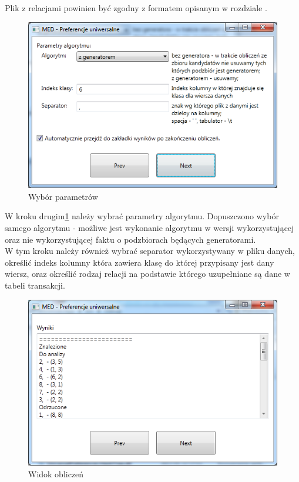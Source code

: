 \documentclass[a4paper,12pt]{article}
\begin{document}
Plik z relacjami powinien być zgodny z formatem opisanym w rozdziale . \\

\begin{figure}[h!]
\begin{center}
\includegraphics[width=\textwidth]{img/2.png}
\caption{Wybór parametrów}
\label{krok2}
\end{center}
\end{figure}

W kroku drugim\ref{krok2} należy wybrać parametry algorytmu. Dopuszczono wybór samego algorytmu - możliwe jest wykonanie algorytmu w wersji wykorzystującej oraz nie wykorzystującej faktu o podzbiorach będących generatorami.\\

W tym kroku należy również wybrać separator wykorzystywany w pliku danych, określić indeks kolumny która zawiera klasę do której przypisany jest dany wiersz, oraz określić rodzaj relacji na podstawie którego uzupełniane są dane w tabeli transakcji.\\

\begin{figure}[h!]
\begin{center}
\includegraphics[width=\textwidth]{img/3.png}
\caption{Widok obliczeń}
\label{krok3}
\end{center}
\end{figure}
\end{document}
